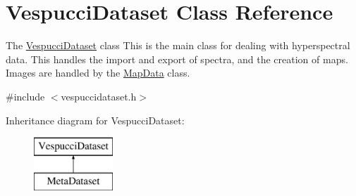 \hypertarget{class_vespucci_dataset}{}\section{Vespucci\+Dataset Class Reference}
\label{class_vespucci_dataset}


The \hyperlink{class_vespucci_dataset}{Vespucci\+Dataset} class This is the main class for dealing with hyperspectral data. This handles the import and export of spectra, and the creation of maps. Images are handled by the \hyperlink{class_map_data}{Map\+Data} class.  




{\ttfamily \#include $<$vespuccidataset.\+h$>$}

Inheritance diagram for Vespucci\+Dataset\+:\begin{figure}[H]
\begin{center}
\leavevmode
\includegraphics[height=2.000000cm]{class_vespucci_dataset}
\end{center}
\end{figure}

